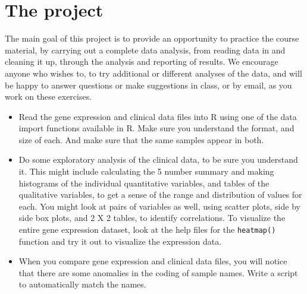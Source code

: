 \documentclass[11pt]{article}
\begin{document}
\section*{The project}
The main goal of this project is to provide an opportunity to practice the course material, by carrying out a complete data analysis, from reading data in and cleaning it up, through the analysis and reporting of results.  We encourage anyone who wishes to, to try additional or different analyses of the data, and will be happy to answer questions or make suggestions in class, or by email, as you work on these exercises.   
\begin{itemize}
\item Read the gene expression and clinical data files into R using one of the data import functions available in R.   Make sure you understand the format, and size of each. And make sure that the same samples appear in both.   
\item Do some exploratory analysis of the clinical data, to be sure you understand it.  This might include calculating the 5 number summary and making histograms of the individual quantitative variables,  and tables of the qualitative variables, to get a sense of the range and distribution of values for each.  You might look at pairs of variables as well, using scatter plots, side by side box plots, and 2 X 2 tables, to identify correlations.   To visualize the  entire gene expression dataset, look at the help files for the {\tt heatmap()} function and try it out to visualize the expression data.  
\item When you compare gene expression and clinical data files, you will notice that there are some anomalies in the coding of sample names.   Write a script to automatically match the names.  


\end{itemize}
\end{document}
